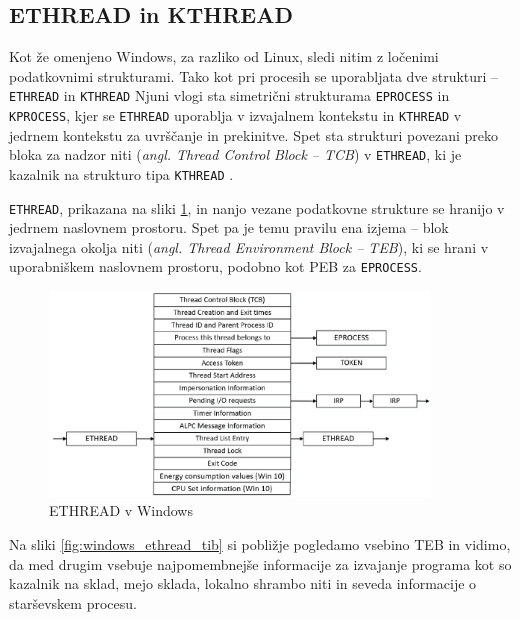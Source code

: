 \documentclass[a4paper,12pt,openright]{book}
\begin{document}
\subsection{ETHREAD in KTHREAD} \label{ssec:windows_process:ethread}

Kot že omenjeno Windows, za razliko od Linux, sledi nitim z ločenimi podatkovnimi strukturami.
Tako kot pri procesih se uporabljata dve strukturi -- \texttt{ETHREAD} in \texttt{KTHREAD} \cite{Yosifovich_Russinovich_Solomon_Ionescu_2017}
Njuni vlogi sta simetrični strukturama \texttt{EPROCESS} in \texttt{KPROCESS}, kjer se \texttt{ETHREAD} uporablja v izvajalnem kontekstu in \texttt{KTHREAD} v jedrnem kontekstu za uvrščanje in prekinitve.
Spet sta strukturi povezani preko bloka za nadzor niti (\textit{angl. Thread Control Block -- TCB}) v \texttt{ETHREAD}, ki je kazalnik na strukturo tipa \texttt{KTHREAD} \cite{Yosifovich_Russinovich_Solomon_Ionescu_2017}.

\texttt{ETHREAD}, prikazana na sliki \ref{fig:windows_ethread}, in nanjo vezane podatkovne strukture se hranijo v jedrnem naslovnem prostoru.
Spet pa je temu pravilu ena izjema -- blok izvajalnega okolja niti (\textit{angl. Thread Environment Block -- TEB}), ki se hrani v uporabniškem naslovnem prostoru, podobno kot PEB za \texttt{EPROCESS}.

\begin{figure}[h!]
	\begin{center}
		\includegraphics[width=0.9\textwidth]{images/windows_ethread.png}
	\end{center}
	\caption{ETHREAD v Windows \cite{Yosifovich_Russinovich_Solomon_Ionescu_2017}}
	\label{fig:windows_ethread}
\end{figure}

Na sliki \ref{fig:windows_ethread_tib} si pobližje pogledamo vsebino TEB in vidimo, da med drugim vsebuje najpomembnejše informacije za izvajanje programa kot so kazalnik na sklad, mejo sklada, lokalno shrambo niti in seveda informacije o starševskem procesu.
\end{document}
